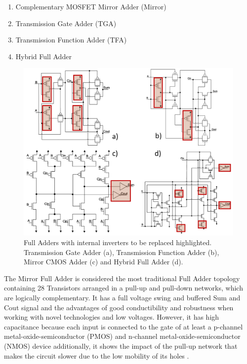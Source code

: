 \documentclass[pgmicro,diss,english]{iiufrgs}
\begin{document}
\begin{enumerate}
    \item Complementary MOSFET Mirror  Adder (Mirror)
    \item Transmission Gate Adder (TGA)
    \item Transmission Function Adder (TFA)
    \item Hybrid Full Adder
\end{enumerate}

\begin{figure}[ht]
\centering
\includegraphics[width=1\textwidth]{FAs.png}
\caption{Full Adders with internal inverters to be replaced highlighted. Transmission Gate Adder (a), Transmission Function Adder (b), Mirror CMOS Adder (c) and Hybrid Full Adder (d).}
\label{fig:FAs}
\end{figure}

The Mirror Full Adder is considered the most traditional Full Adder topology containing 28 Transistors arranged in a pull-up and pull-down networks, which are logically complementary. It has a full voltage swing and buffered Sum and Cout signal and the advantages of good conductibility and robustness when working with novel technologies and low voltages. However, it has high capacitance because each input is connected to the gate of at least a p-channel metal-oxide-semiconductor (PMOS) and n-channel metal-oxide-semiconductor (NMOS) device additionally, it shows the impact of the pull-up network that makes the circuit slower due to the low mobility of its holes \cite{beckett2002fine} \cite{devadas2017design} \cite{islam2011design}.
\end{document}
